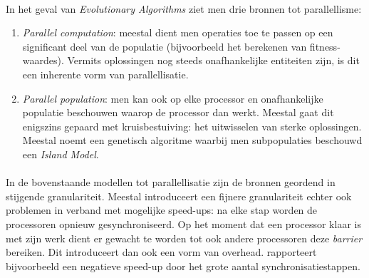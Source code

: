 \paragraph{}
In het geval van \emph{Evolutionary Algorithms} ziet men drie bronnen tot parallellisme:
\begin{enumerate}
 \item \emph{Parallel computation}: meestal dient men operaties toe te passen op een significant deel van de populatie (bijvoorbeeld het berekenen van fitness-waardes). Vermits oplossingen nog steeds onafhankelijke entiteiten zijn, is dit een inherente vorm van parallellisatie.
 \item \emph{Parallel population}: men kan ook op elke processor en onafhankelijke populatie beschouwen waarop de processor dan werkt. Meestal gaat dit enigszins gepaard met kruisbestuiving: het uitwisselen van sterke oplossingen. Meestal noemt een genetisch algoritme waarbij men subpopulaties beschouwd een \emph{Island Model}\cite{islandModel}.
\end{enumerate}

\paragraph{}
In de bovenstaande modellen tot parallellisatie zijn de bronnen geordend in stijgende granulariteit. Meestal introduceert een fijnere granulariteit echter ook problemen in verband met mogelijke speed-ups: na elke stap worden de processoren opnieuw gesynchroniseerd. Op het moment dat een processor klaar is met zijn werk dient er gewacht te worden tot ook andere processoren deze \emph{barrier} bereiken. Dit introduceert dan ook een vorm van overhead. \cite{alba4-43} rapporteert bijvoorbeeld een negatieve speed-up door het grote aantal synchronisatiestappen.


